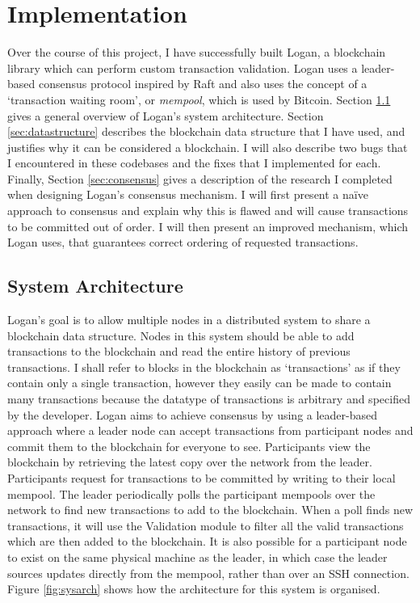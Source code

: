 \documentclass[12pt,a4paper,twoside,openright]{report}
\begin{document}
	\chapter{Implementation} \label{Implementation}
	Over the course of this project, I have successfully built Logan, a blockchain library which can perform custom transaction validation.
	Logan uses a leader-based consensus protocol inspired by Raft \cite{Raft} and also uses the concept of a `transaction waiting room', or \textit{mempool}, which is used by Bitcoin.
	Section \ref{sec:sysarch} gives a general overview of Logan's system architecture.
	Section \ref{sec:datastructure} describes the blockchain data structure that I have used, and justifies why it can be considered a blockchain.
	I will also describe two bugs that I encountered in these codebases and the fixes that I implemented for each.
	Finally, Section \ref{sec:consensus} gives a description of the research I completed when designing Logan's consensus mechanism. 
	I will first present a na\"{i}ve approach to consensus and explain why this is flawed and will cause transactions to be committed out of order.
	I will then present an improved mechanism, which Logan uses, that guarantees correct ordering of requested transactions.

	\section{System Architecture}\label{sec:sysarch}
	Logan's goal is to allow multiple nodes in a distributed system to share a blockchain data structure.
	Nodes in this system should be able to add transactions to the blockchain and read the entire history of previous transactions.
	I shall refer to blocks in the blockchain as `transactions' as if they contain only a single transaction, however they easily can be made to contain many transactions because the datatype of transactions is arbitrary and specified by the developer.
	Logan aims to achieve consensus by using a leader-based approach where a leader node can accept transactions from participant nodes and commit them to the blockchain for everyone to see.
	Participants view the blockchain by retrieving the latest copy over the network from the leader.
	Participants request for transactions to be committed by writing to their local mempool. 
	The leader periodically polls the participant mempools over the network to find new transactions to add to the blockchain.
	When a poll finds new transactions, it will use the Validation module to filter all the valid transactions which are then added to the blockchain.
	It is also possible for a participant node to exist on the same physical machine as the leader, in which case the leader sources updates directly from the mempool, rather than over an SSH connection. 
	Figure \ref{fig:sysarch} shows how the architecture for this system is organised.\\	
\end{document}
